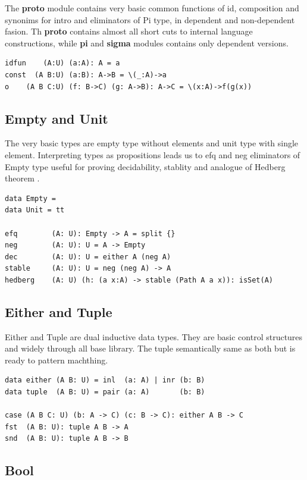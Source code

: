 \documentclass{article}
\begin{document}
The {\bf proto} module contains very basic common functions of id, composition and
synonims for intro and eliminators of Pi type, in dependent and non-dependent fasion.
Th {\bf proto} contains almost all short cuts to internal language constructions,
while {\bf pi} and {\bf sigma} modules contains only dependent versions.

\begin{lstlisting}[mathescape=true]
idfun    (A:U) (a:A): A = a
const  (A B:U) (a:B): A->B = \(_:A)->a
o    (A B C:U) (f: B->C) (g: A->B): A->C = \(x:A)->f(g(x))
\end{lstlisting}

\subsection{Empty and Unit}

The very basic types are empty type without elements and unit type with single element.
Interpreting types as propositions leads us to efq and neg eliminators of Empty type useful
for proving decidability, stablity and analogue of Hedberg theorem \cite{Hedberg98}.

\begin{lstlisting}[mathescape=true]
data Empty =
data Unit = tt

efq        (A: U): Empty -> A = split {}
neg        (A: U): U = A -> Empty
dec        (A: U): U = either A (neg A)
stable     (A: U): U = neg (neg A) -> A
hedberg    (A: U) (h: (a x:A) -> stable (Path A a x)): isSet(A)
\end{lstlisting}

\subsection{Either and Tuple}

Either and Tuple are dual inductive data types.
They are  basic control structures and widely through all base library.
The tuple semantically same as both but is ready to pattern machthing.

\begin{lstlisting}[mathescape=true]
data either (A B: U) = inl  (a: A) | inr (b: B)
data tuple  (A B: U) = pair (a: A)       (b: B)

case (A B C: U) (b: A -> C) (c: B -> C): either A B -> C
fst  (A B: U): tuple A B -> A
snd  (A B: U): tuple A B -> B
\end{lstlisting}

\subsection{Bool}
\end{document}
